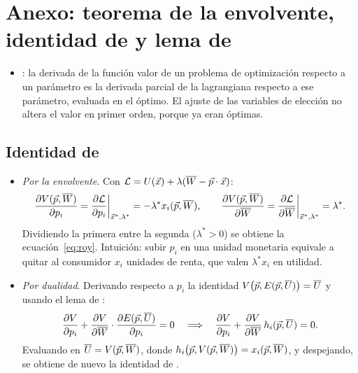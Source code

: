 \documentclass[11pt]{article}
\begin{document}
\section{Anexo: teorema de la envolvente,\cortetitulo{} identidad de  y lema de }\label{anexo:envolvente}

\begin{itemize}
\item {}: la derivada de la función valor de un problema de optimización respecto a un parámetro es la derivada parcial de la lagrangiana respecto a ese parámetro, evaluada en el óptimo. El ajuste de las variables de elección no altera el valor en primer orden, porque ya eran óptimas.
\end{itemize}

\subsection{Identidad de }\label{der:roy}

\begin{itemize}
\item \emph{Por la envolvente}. Con $\mathcal{L}=U(\vec{x})+\lambda(\overline{W}-\vec{p}\cdot\vec{x})$:
  \begin{equation*}
  \frac{\partial V(\vec{p},\overline{W})}{\partial p_i}=\frac{\partial\mathcal{L}}{\partial p_i}\bigg|_{\vec{x}^*,\lambda^*}=-\lambda^*x_i(\vec{p},\overline{W}),\qquad\frac{\partial V(\vec{p},\overline{W})}{\partial\overline{W}}=\frac{\partial\mathcal{L}}{\partial\overline{W}}\bigg|_{\vec{x}^*,\lambda^*}=\lambda^*.
  \end{equation*}
  Dividiendo la primera entre la segunda ($\lambda^*>0$) se obtiene la ecuación~\eqref{eq:roy}. Intuición: subir $p_i$ en una unidad monetaria equivale a quitar al consumidor $x_i$ unidades de renta, que valen $\lambda^*x_i$ en utilidad.\findemo
\item \emph{Por dualidad}. Derivando respecto a $p_i$ la identidad $V\big(\vec{p},E(\vec{p},\overline{U})\big)=\overline{U}$ y usando el lema de :
  \begin{equation*}
  \frac{\partial V}{\partial p_i}+\frac{\partial V}{\partial\overline{W}}\cdot\frac{\partial E(\vec{p},\overline{U})}{\partial p_i}=0\quad\Longrightarrow\quad\frac{\partial V}{\partial p_i}+\frac{\partial V}{\partial\overline{W}}\,h_i(\vec{p},\overline{U})=0.
  \end{equation*}
  Evaluando en $\overline{U}=V(\vec{p},\overline{W})$, donde $h_i\big(\vec{p},V(\vec{p},\overline{W})\big)=x_i(\vec{p},\overline{W})$, y despejando, se obtiene de nuevo la identidad de \nocite{MasColellWhinstonGreen1995}.\findemo
\end{itemize}
\end{document}
